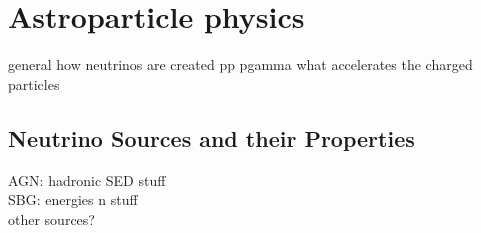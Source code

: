 \chapter{Astroparticle physics} \label{sec:astro}

general how neutrinos are created pp pgamma
what accelerates the charged particles


\section{Neutrino Sources and their Properties}

AGN: hadronic SED stuff\\
SBG: energies n stuff\\
other sources?

